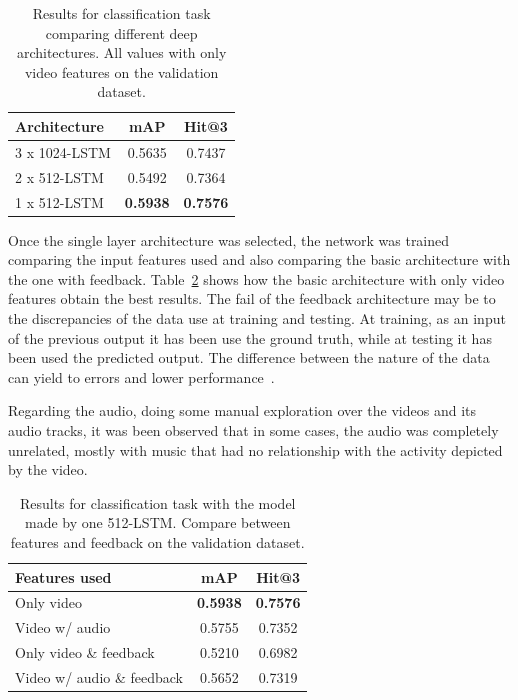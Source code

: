 \begin{table}[H]
\begin{center}
\begin{tabular}{|l|c|c|}
\hline
Architecture & mAP & Hit@3 \\
\hline\hline
3 x 1024-LSTM & 0.5635 & 0.7437 \\
2 x 512-LSTM & 0.5492 & 0.7364 \\
1 x 512-LSTM & \bf0.5938 & \bf0.7576 \\
\hline
\end{tabular}
\end{center}
\caption{Results for classification task comparing different deep architectures. All values with
         only video features on the validation dataset.}
\label{table:classification_by_architecture}
\end{table}

Once the single layer architecture was selected, the network was trained comparing the input features used and also comparing the basic architecture with the one with feedback.  Table~\ref{table:classification_by_features} shows how the basic architecture  with only video features obtain the best results.
The fail of the feedback architecture may be to the discrepancies of the data use at training and testing. At training, as an input of the previous output it has been use the ground truth, while at testing it has been used the predicted output. The difference between the nature of the data can yield to errors and lower performance~\cite{bengio2015scheduled}. %

Regarding the audio, doing some manual exploration over the videos and its audio tracks, it was been observed that in some cases, the audio was completely unrelated, mostly with music that had no relationship with the activity depicted by the video.

\begin{table}[H]
\begin{center}
\begin{tabular}{|l|c|c|}
\hline
Features used & mAP & Hit@3 \\
\hline\hline
Only video & \bf0.5938 & \bf0.7576 \\
Video w/ audio & 0.5755 & 0.7352 \\
Only video \& feedback & 0.5210 & 0.6982 \\
Video w/ audio \& feedback & 0.5652 & 0.7319 \\
\hline
\end{tabular}
\end{center}
\caption{Results for classification task with the model made by one 512-LSTM. Compare between
         features and feedback on the validation dataset.}
\label{table:classification_by_features}
\end{table}

